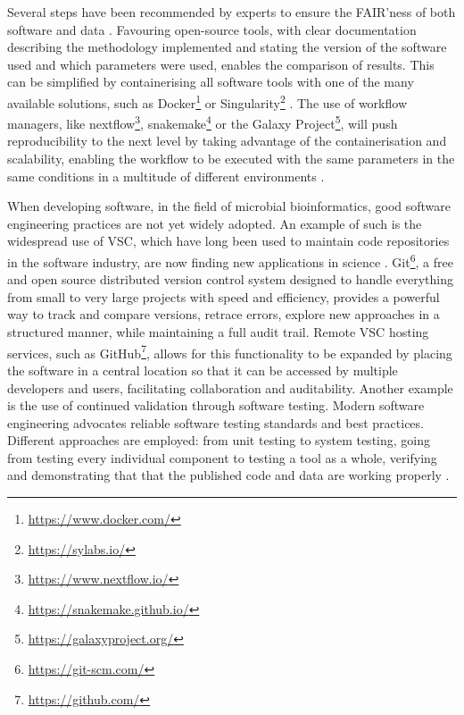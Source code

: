 Several steps have been recommended by experts to ensure the FAIR'ness of both software and data \citep{ram_git_2013, piccolo_tools_2016, boettiger_introduction_2015, sandve_ten_2013}. Favouring open-source tools, with clear documentation describing the methodology implemented and stating the version of the software used and which parameters were used, enables the comparison of results. 
This can be simplified by containerising all software tools with one of the many available solutions, such as Docker\footnote{\url{https://www.docker.com/}} or Singularity\footnote{\url{https://sylabs.io/}} \citep{kurtzer_singularity_2017}. The use of workflow managers, like nextflow\footnote{\url{https://www.nextflow.io/}}, snakemake\footnote{\url{https://snakemake.github.io/}} or the Galaxy Project\footnote{\url{https://galaxyproject.org/}}, will push reproducibility to the next level by taking advantage of the containerisation and scalability, enabling the workflow to be executed with the same parameters in the same conditions in a multitude of different environments \citep{di_tommaso_nextflow_2017, molder_sustainable_2021, afgan_galaxy_2018}. 

When developing software, in the field of microbial bioinformatics, good software engineering practices are not yet widely adopted. An example of such is the widespread use of \ac{VSC}, which have long been used to maintain code repositories in the software industry, are now finding new applications in science \citep{ram_git_2013}. Git\footnote{\url{https://git-scm.com/}}, a free and open source distributed version control system designed to handle everything from small to very large projects with speed and efficiency,  provides a powerful way to track and compare versions, retrace errors, explore new approaches in a structured manner, while maintaining a full audit trail. Remote \ac{VSC} hosting services, such as GitHub\footnote{\url{https://github.com/}}, allows for this functionality to be expanded by placing the software in a central location so that it can be accessed by multiple developers and users, facilitating collaboration and auditability. Another example is the use of continued validation through software testing. Modern software engineering advocates reliable software testing standards and best practices. Different approaches are employed: from unit testing to system testing, going from testing every individual component to testing a tool as a whole, verifying and demonstrating that that the published code and data are working properly \citep{krafczyk_scientific_2019}.

